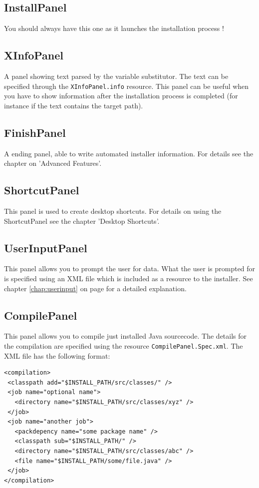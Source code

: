 \subsection{InstallPanel}

You should always have this one as it launches the installation process !\\

\subsection{XInfoPanel}

A panel showing text parsed by the variable substitutor. The text can be
specified through the \texttt{XInfoPanel.info} resource. This panel can
be useful when you have to show information after the installation
process is completed (for instance if the text contains the target
path).\\

\subsection{FinishPanel}

A ending panel, able to write automated installer information. For
details see the chapter on 'Advanced Features'.\\ 

\subsection{ShortcutPanel}

This panel is used to create desktop shortcuts. For details on using the
ShortcutPanel see the chapter 'Desktop Shortcuts'.

\subsection{UserInputPanel}

This panel allows you to prompt the user for data. What the user is prompted
for is specified using an XML file which is included as a resource to the
installer. See chapter \ref{chap:userinput} on page \pageref{chap:userinput}
for a detailed explanation.

\subsection{CompilePanel}

This panel allows you to compile just installed Java sourcecode. The details for the compilation are specified using the resource \texttt{CompilePanel.Spec.xml}.
The XML file has the following format:
\begin{verbatim}
<compilation>
 <classpath add="$INSTALL_PATH/src/classes/" />
 <job name="optional name">
   <directory name="$INSTALL_PATH/src/classes/xyz" />
 </job>
 <job name="another job">
   <packdepency name="some package name" />
   <classpath sub="$INSTALL_PATH/" />
   <directory name="$INSTALL_PATH/src/classes/abc" />
   <file name="$INSTALL_PATH/some/file.java" />
 </job>
</compilation>
\end{verbatim}

